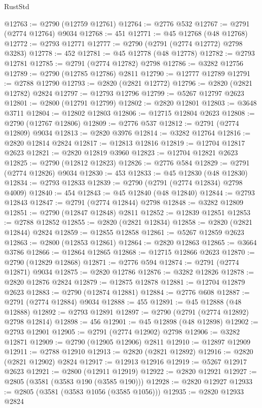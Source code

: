 \begin{lexlean}{RustStd}
\begin{coremodule}
@12763 := @2790 (@12759 @12761)
@12764 := @2776 @532
@12767 := @2791 (@2774 @12764) @9034
@12768 := 451
@12771 := @45 @12768 (@48 @12768)
@12772 := @2793 @12771
@12777 := @2790 (@2791 (@2774 @12772) @2798 @3283)
@12778 := 452
@12781 := @45 @12778 (@48 @12778)
@12782 := @2793 @12781
@12785 := @2791 (@2774 @12782) @2798
@12786 := @3282 @12756
@12789 := @2790 (@12785 @12786) @2811
@12790 := @12777 @12789
@12791 := @2788 @12790
@12793 := @2820 (@2821 @12772)
@12796 := @2820 (@2821 @12782) @2824
@12797 := @12793 @12796
@12799 := @5267 @12797 @2623
@12801 := @2800 (@12791 @12799)
@12802 := @2820 @12801
@12803 := @3648 @3711
@12804 := @12802 @12803
@12806 := @12715 @12804 @2623
@12808 := @2790 (@12767 @12806)
@12809 := @2776 @537
@12812 := @2791 (@2774 @12809) @9034
@12813 := @2820 @3976
@12814 := @3282 @12764
@12816 := @2820 @12814 @2824
@12817 := @12813 @12816
@12819 := @12704 @12817 @2623
@12821 := @2820 @12819 @3960
@12823 := @12704 @12821 @2623
@12825 := @2790 (@12812 @12823)
@12826 := @2776 @584
@12829 := @2791 (@2774 @12826) @9034
@12830 := 453
@12833 := @45 @12830 (@48 @12830)
@12834 := @2793 @12833
@12839 := @2790 (@2791 (@2774 @12834) @2798 @4009)
@12840 := 454
@12843 := @45 @12840 (@48 @12840)
@12844 := @2793 @12843
@12847 := @2791 (@2774 @12844) @2798
@12848 := @3282 @12809
@12851 := @2790 (@12847 @12848) @2811
@12852 := @12839 @12851
@12853 := @2788 @12852
@12855 := @2820 (@2821 @12834)
@12858 := @2820 (@2821 @12844) @2824
@12859 := @12855 @12858
@12861 := @5267 @12859 @2623
@12863 := @2800 (@12853 @12861)
@12864 := @2820 @12863
@12865 := @3664 @3786
@12866 := @12864 @12865
@12868 := @12715 @12866 @2623
@12870 := @2790 (@12829 @12868)
@12871 := @2776 @594
@12874 := @2791 (@2774 @12871) @9034
@12875 := @2820 @12786
@12876 := @3282 @12826
@12878 := @2820 @12876 @2824
@12879 := @12875 @12878
@12881 := @12704 @12879 @2623
@12883 := @2790 (@12874 @12881)
@12884 := @2776 @608
@12887 := @2791 (@2774 @12884) @9034
@12888 := 455
@12891 := @45 @12888 (@48 @12888)
@12892 := @2793 @12891
@12897 := @2790 (@2791 (@2774 @12892) @2798 @12814)
@12898 := 456
@12901 := @45 @12898 (@48 @12898)
@12902 := @2793 @12901
@12905 := @2791 (@2774 @12902) @2798
@12906 := @3282 @12871
@12909 := @2790 (@12905 @12906) @2811
@12910 := @12897 @12909
@12911 := @2788 @12910
@12913 := @2820 (@2821 @12892)
@12916 := @2820 (@2821 @12902) @2824
@12917 := @12913 @12916
@12919 := @5267 @12917 @2623
@12921 := @2800 (@12911 @12919)
@12922 := @2820 @12921
@12927 := @2805 (@3581 (@3583 @190 (@3585 @190)))
@12928 := @2820 @12927
@12933 := @2805 (@3581 (@3583 @1056 (@3585 @1056)))
@12935 := @2820 @12933 @2824

\end{coremodule}
\end{lexlean}
